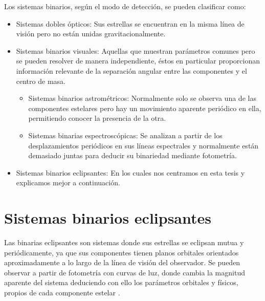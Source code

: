 \documentclass[12pt,oneside,openany,letter]{book}
\begin{document}
\noindent Los sistemas binarios, según el modo de detección, se pueden clasificar como:
\begin{itemize}
    \item Sistemas dobles ópticos: Sus estrellas se encuentran en la misma línea de visión pero no están unidas gravitacionalmente.
    \item Sistemas binarios visuales: Aquellas que muestran parámetros comunes pero se pueden resolver de manera independiente, éstos en particular proporcionan información relevante de la separación angular entre las componentes y el centro de masa.
    \begin{itemize}
        \item Sistemas binarios astrométricos: Normalmente solo se observa una de las componentes estelares pero hay un movimiento aparente periódico en ella, permitiendo conocer la presencia de la otra.
        \item Sistemas binarias espectroscópicas: Se analizan a partir de los desplazamientos periódicos en sus líneas espectrales y normalmente están demasiado juntas para deducir su binariedad mediante fotometría.
    \end{itemize}
    \item Sistemas binarios eclipsantes: En los cuales nos centramos en esta tesis y explicamos mejor a continuación.
\end{itemize}

\section*{Sistemas binarios eclipsantes}

Las binarias eclipsantes son sistemas donde sus estrellas se eclipsan mutua y periódicamente, ya que sus componentes tienen planos orbitales orientados aproximadamente a lo largo de la línea de visión del observador. Se pueden observar a partir de fotometría con curvas de luz, donde cambia la magnitud aparente del sistema deduciendo con ello los parámetros orbitales y físicos, propios de cada componente estelar \citep{carroll2017introduction}.
\end{document}
